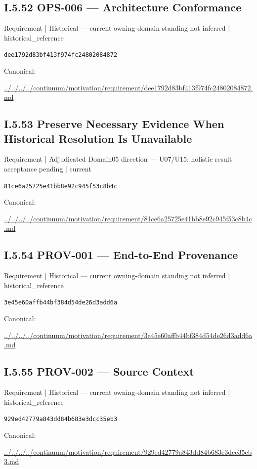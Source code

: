 \documentclass[10pt,a4paper]{article}
\begin{document}
\subsection*{I.5.52 OPS-006 — Architecture Conformance}
\label{element-dee1792d83bf413f974fc24802084872}
{\small Requirement | Historical — current owning-domain standing not inferred | historical\_reference}\par
\texttt{dee1792d83bf413f974fc24802084872}\par
Canonical: \par
{\footnotesize\url{../../../../continuum/motivation/requirement/dee1792d83bf413f974fc24802084872.md}}\par
\subsection*{I.5.53 Preserve Necessary Evidence When Historical Resolution Is Unavailable}
\label{element-81ce6a25725e41bb8e92c945f53c8b4c}
{\small Requirement | Adjudicated Domain05 direction — U07/U15; holistic result acceptance pending | current}\par
\texttt{81ce6a25725e41bb8e92c945f53c8b4c}\par
Canonical: \par
{\footnotesize\url{../../../../continuum/motivation/requirement/81ce6a25725e41bb8e92c945f53c8b4c.md}}\par
\subsection*{I.5.54 PROV-001 — End-to-End Provenance}
\label{element-3e45e60affb44bf384d54de26d3add6a}
{\small Requirement | Historical — current owning-domain standing not inferred | historical\_reference}\par
\texttt{3e45e60affb44bf384d54de26d3add6a}\par
Canonical: \par
{\footnotesize\url{../../../../continuum/motivation/requirement/3e45e60affb44bf384d54de26d3add6a.md}}\par
\subsection*{I.5.55 PROV-002 — Source Context}
\label{element-929ed42779a843dd84b683e3dcc35eb3}
{\small Requirement | Historical — current owning-domain standing not inferred | historical\_reference}\par
\texttt{929ed42779a843dd84b683e3dcc35eb3}\par
Canonical: \par
{\footnotesize\url{../../../../continuum/motivation/requirement/929ed42779a843dd84b683e3dcc35eb3.md}}\par
\end{document}
